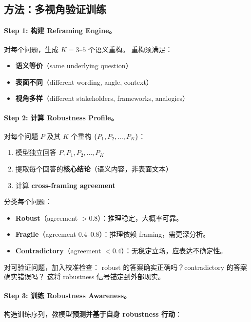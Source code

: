 \documentclass[12pt,a4paper]{article}
\begin{document}
\subsection{方法：多视角验证训练}

\paragraph{Step 1: 构建 Reframing Engine。}
对每个问题，生成 $K = 3\text{--}5$ 个语义重构。
重构须满足：
\begin{itemize}[leftmargin=2em]
  \item \textbf{语义等价}（same underlying question）
  \item \textbf{表面不同}（different wording, angle, context）
  \item \textbf{视角多样}（different stakeholders, frameworks, analogies）
\end{itemize}

\paragraph{Step 2: 计算 Robustness Profile。}
对每个问题 $P$ 及其 $K$ 个重构 $\{P_1, P_2, \ldots, P_K\}$：
\begin{enumerate}[leftmargin=2em]
  \item 模型独立回答 $P, P_1, P_2, \ldots, P_K$
  \item 提取每个回答的\textbf{核心结论}（语义内容，非表面文本）
  \item 计算 \textbf{cross-framing agreement}
\end{enumerate}

\noindent
分类每个问题：
\begin{itemize}[leftmargin=2em]
  \item \textbf{Robust}（agreement $> 0.8$）：推理稳定，大概率可靠。
  \item \textbf{Fragile}（agreement $0.4\text{--}0.8$）：推理依赖 framing，需更深分析。
  \item \textbf{Contradictory}（agreement $< 0.4$）：无稳定立场，应表达不确定性。
\end{itemize}

\noindent
对可验证问题，加入校准检查：
robust 的答案确实正确吗？contradictory 的答案确实错误吗？
这将 robustness 信号锚定到外部现实。

\paragraph{Step 3: 训练 Robustness Awareness。}
构造训练序列，教模型\textbf{预测并基于自身 robustness 行动}：
\end{document}
